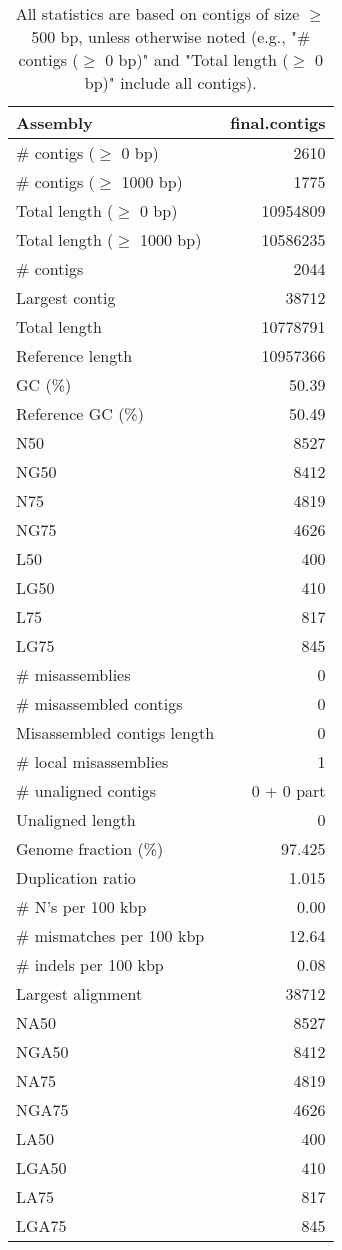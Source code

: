 \documentclass[12pt,a4paper]{article}
\begin{document}
\begin{table}[ht]
\begin{center}
\caption{All statistics are based on contigs of size $\geq$ 500 bp, unless otherwise noted (e.g., "\# contigs ($\geq$ 0 bp)" and "Total length ($\geq$ 0 bp)" include all contigs).}
\begin{tabular}{|l*{1}{|r}|}
\hline
Assembly & final.contigs \\ \hline
\# contigs ($\geq$ 0 bp) & 2610 \\ \hline
\# contigs ($\geq$ 1000 bp) & 1775 \\ \hline
Total length ($\geq$ 0 bp) & 10954809 \\ \hline
Total length ($\geq$ 1000 bp) & 10586235 \\ \hline
\# contigs & 2044 \\ \hline
Largest contig & 38712 \\ \hline
Total length & 10778791 \\ \hline
Reference length & 10957366 \\ \hline
GC (\%) & 50.39 \\ \hline
Reference GC (\%) & 50.49 \\ \hline
N50 & 8527 \\ \hline
NG50 & 8412 \\ \hline
N75 & 4819 \\ \hline
NG75 & 4626 \\ \hline
L50 & 400 \\ \hline
LG50 & 410 \\ \hline
L75 & 817 \\ \hline
LG75 & 845 \\ \hline
\# misassemblies & 0 \\ \hline
\# misassembled contigs & 0 \\ \hline
Misassembled contigs length & 0 \\ \hline
\# local misassemblies & 1 \\ \hline
\# unaligned contigs & 0 + 0 part \\ \hline
Unaligned length & 0 \\ \hline
Genome fraction (\%) & 97.425 \\ \hline
Duplication ratio & 1.015 \\ \hline
\# N's per 100 kbp & 0.00 \\ \hline
\# mismatches per 100 kbp & 12.64 \\ \hline
\# indels per 100 kbp & 0.08 \\ \hline
Largest alignment & 38712 \\ \hline
NA50 & 8527 \\ \hline
NGA50 & 8412 \\ \hline
NA75 & 4819 \\ \hline
NGA75 & 4626 \\ \hline
LA50 & 400 \\ \hline
LGA50 & 410 \\ \hline
LA75 & 817 \\ \hline
LGA75 & 845 \\ \hline
\end{tabular}
\end{center}
\end{table}
\end{document}
